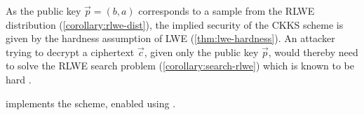 As the public key $\vec{p} = (b, a)$ corresponds to a sample from the RLWE distribution (\cref{corollary:rlwe-dist}), the implied security of the CKKS scheme is given by the hardness assumption of LWE (\cref{thm:lwe-hardness}).
An attacker trying to decrypt a ciphertext $\vec{c}$, given only the public key $\vec{p}$, would thereby need to solve the RLWE search problem (\cref{corollary:search-rlwe}) which is known to be hard \parencite{2010-rlwe-original}.

\cite{seal-4.0} implements the scheme, enabled using .
